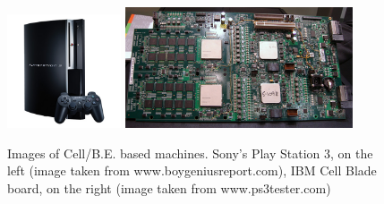 \begin{figure}
    \centering
    \includegraphics[width=0.3\textwidth]{data/png/PS3}
    \includegraphics[width=0.6\textwidth]{data/png/ibm-cell-board}
    \caption[\mbox{Cell/B.E.} based machines]{Images of \mbox{Cell/B.E.} based machines.
Sony's Play Station 3, on the left (image taken from www.boygeniusreport.com), IBM Cell Blade board, on the right (image taken from www.ps3tester.com)
}
    \label{fg:cellmachines}
\end{figure}

